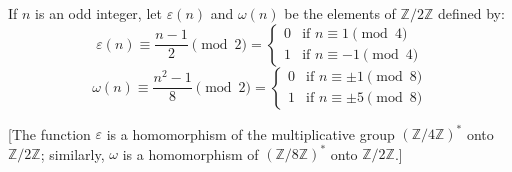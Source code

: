 If $n$ is an odd integer, let $\varepsilon(n)$ and $\omega(n)$ be the elements of $\mathbb{Z}/2\mathbb{Z}$ defined by:
$$\varepsilon(n) \equiv \frac{n-1}{2} \pmod{2} = \begin{cases} 0 & \text{if } n \equiv 1 \pmod{4} \\ 1 & \text{if } n \equiv -1 \pmod{4} \end{cases}$$
$$\omega(n) \equiv \frac{n^2-1}{8} \pmod{2} = \begin{cases} 0 & \text{if } n \equiv \pm 1 \pmod{8} \\ 1 & \text{if } n \equiv \pm 5 \pmod{8} \end{cases}$$

[The function $\varepsilon$ is a homomorphism of the multiplicative group $(\mathbb{Z}/4\mathbb{Z})^*$ onto $\mathbb{Z}/2\mathbb{Z}$; similarly, $\omega$ is a homomorphism of $(\mathbb{Z}/8\mathbb{Z})^*$ onto $\mathbb{Z}/2\mathbb{Z}$.]
